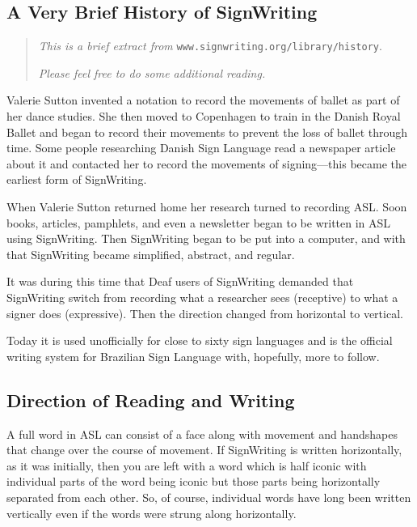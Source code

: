 \documentclass{article}
\begin{document}
\subsection{A Very Brief History of SignWriting}

\begin{quote}
\begin{center}
{\it This is a brief extract from} \texttt{www.signwriting.org/library/history}.

{\it Please feel free to do some additional reading.}
\end{center}
\end{quote}

Valerie Sutton invented a notation to record the movements of ballet as part of her dance studies.
She then moved to Copenhagen to train in the Danish Royal Ballet and began to record their movements to prevent the loss of ballet through time.
Some people researching Danish Sign Language read a newspaper article about it and contacted her to record the movements of signing---this became the earliest form of SignWriting.

When Valerie Sutton returned home her research turned to recording ASL.
Soon books, articles, pamphlets, and even a newsletter began to be written in ASL using SignWriting.
Then SignWriting began to be put into a computer, and with that SignWriting became simplified, abstract, and regular.

It was during this time that Deaf users of SignWriting demanded that SignWriting switch from recording what a researcher sees (receptive) to what a signer does (expressive).
Then the direction changed from horizontal to vertical.

Today it is used unofficially for close to sixty sign languages and is the official writing system for Brazilian Sign Language with, hopefully, more to follow.

\subsection{Direction of Reading and Writing}

A full word in ASL can consist of a face along with movement and handshapes that change over the course of movement.
If SignWriting is written horizontally, as it was initially, then you are left with a word which is half iconic with individual parts of the word being iconic but those parts being horizontally separated from each other.
So, of course, individual words have long been written vertically even if the words were strung along horizontally.
\end{document}
